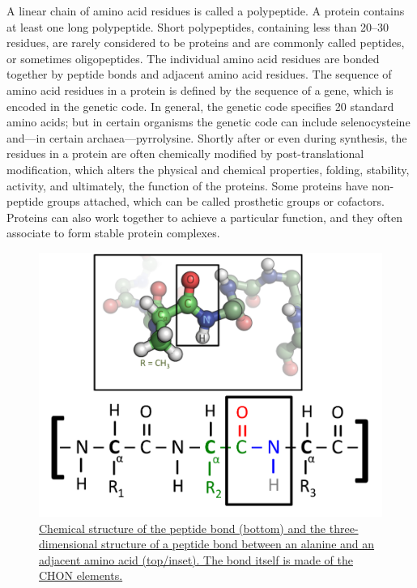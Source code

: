 A linear chain of amino acid residues is called a polypeptide. A protein contains at least one long polypeptide. Short polypeptides, containing less than 20--30 residues, are rarely considered to be proteins and are commonly called peptides, or sometimes oligopeptides. The individual amino acid residues are bonded together by peptide bonds and adjacent amino acid residues. The sequence of amino acid residues in a protein is defined by the sequence of a gene, which is encoded in the genetic code. In general, the genetic code specifies 20 standard amino acids; but in certain organisms the genetic code can include selenocysteine and---in certain archaea---pyrrolysine. Shortly after or even during synthesis, the residues in a protein are often chemically modified by post-translational modification, which alters the physical and chemical properties, folding, stability, activity, and ultimately, the function of the proteins. Some proteins have non-peptide groups attached, which can be called prosthetic groups or cofactors. Proteins can also work together to achieve a particular function, and they often associate to form stable protein complexes.



\begin{figure}

{\centering \includegraphics[width=0.7\linewidth]{./figures/chemistry/Peptide-Figure-Revised} 

}

\caption{\href{https://commons.wikimedia.org/wiki/File:Peptide-Figure-Revised.png}{Chemical structure of the peptide bond (bottom) and the three-dimensional structure of a peptide bond between an alanine and an adjacent amino acid (top/inset). The bond itself is made of the CHON elements.}}\label{fig:peptidebond}
\end{figure}

